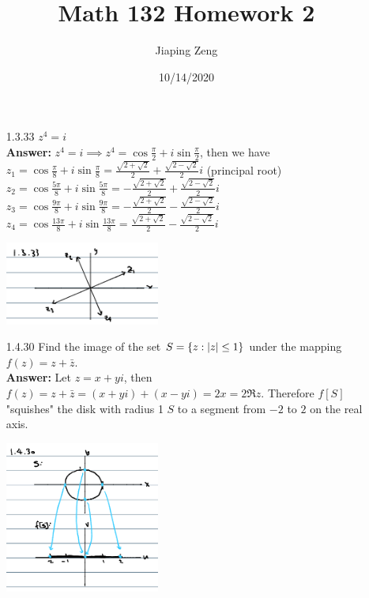 \documentclass{article}
\title{Math 132 Homework 2}
\date{10/14/2020}
\author{Jiaping Zeng}
\begin{document}
\maketitle

\begin{itemize}
    \item [1.3.33] $z^4=i$\\
          \textbf{Answer: } $z^4=i\implies z^4=\cos\frac{\pi}{2}+i\sin\frac{\pi}{2}$, then we have \\$z_1=\cos\frac{\pi}{8}+i\sin\frac{\pi}{8}=\frac{\sqrt{2+\sqrt{2}}}{2}+\frac{\sqrt{2-\sqrt{2}}}{2}i$ (principal root)\\$z_2=\cos\frac{5\pi}{8}+i\sin\frac{5\pi}{8}=-\frac{\sqrt{2+\sqrt{2}}}{2}+\frac{\sqrt{2-\sqrt{2}}}{2}i$\\$z_3=\cos\frac{9\pi}{8}+i\sin\frac{9\pi}{8}=-\frac{\sqrt{2+\sqrt{2}}}{2}-\frac{\sqrt{2-\sqrt{2}}}{2}i$\\$z_4=\cos\frac{13\pi}{8}+i\sin\frac{13\pi}{8}=\frac{\sqrt{2+\sqrt{2}}}{2}-\frac{\sqrt{2-\sqrt{2}}}{2}i$
          \begin{center}
              \includegraphics[width=2in]{1-3-33.png}
          \end{center}
    \item [1.4.30] Find the image of the set $S=\{z:\abs{z}\leq 1\}$ under the mapping $f(z)=z+\bar{z}$.\\
          \textbf{Answer: } Let $z=x+yi$, then $f(z)=z+\bar{z}=(x+yi)+(x-yi)=2x=2\Re z$. Therefore $f[S]$ "squishes" the disk with radius 1 $S$ to a segment from $-2$ to $2$ on the real axis.
          \begin{center}
              \includegraphics[width=2in]{1-4-30.png}
          \end{center}

\end{itemize}
\end{document}
